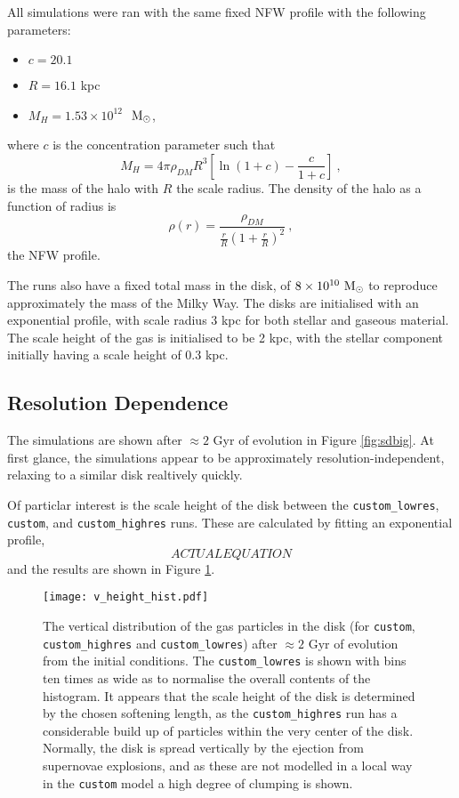 All simulations were ran with the same fixed NFW profile with the following parameters:
\begin{itemize}
    \item $c = 20.1$
    \item $R = 16.1$ kpc
    \item $M_{H} = 1.53 \times 10^{12}$ $~\mathrm{M}_{\odot}$,
\end{itemize}
where $c$ is the concentration parameter such that
$$
    M_{H} = 4\pi \rho_{DM} R^3 \left[ \ln (1 + c) - \frac{c}{1+c} \right]~,
$$
is the mass of the halo with $R$ the scale radius.
The density of the halo as a function of radius is 
\begin{equation}
    \rho(r) = \frac{\rho_{DM}}{\frac{r}{R} \left( 1 + \frac{r}{R} \right)^2}~,
    \label{eqn:nfw}
\end{equation}
the NFW profile.

The runs also have a fixed total mass in the disk, of $8\times10^{10} ~\mathrm{M}_{\odot}$ to reproduce approximately the mass of the Milky Way.
The disks are initialised with an exponential profile, with scale radius $3$ kpc for both stellar and gaseous material.
The scale height of the gas is initialised to be 2 kpc, with the stellar component initially having a scale height of 0.3 kpc.

\subsection{Resolution Dependence}

The simulations are shown after $\approx 2$ Gyr of evolution in Figure \ref{fig:sdbig}. At first glance, the simulations appear to be approximately resolution-independent, relaxing to a similar disk realtively quickly.

Of particlar interest is the scale height of the disk between the {\tt custom\_lowres}, {\tt custom}, and {\tt custom\_highres} runs.
These are calculated by fitting an exponential profile,
$$
    ACTUAL EQUATION
$$
and the results are shown in Figure \ref{fig:vheighthist}.

\begin{figure}
    \centering
    \texttt{[image: v\_height\_hist.pdf]}
    \caption{The vertical distribution of the gas particles in the disk (for {\tt custom}, {\tt custom\_highres} and {\tt custom\_lowres}) after $\approx 2$ Gyr of evolution from the initial conditions. The {\tt custom\_lowres} is shown with bins ten times as wide as to normalise the overall contents of the histogram. It appears that the scale height of the disk is determined by the chosen softening length, as the {\tt custom\_highres} run has a considerable build up of particles within the very center of the disk. Normally, the disk is spread vertically by the ejection from supernovae explosions, and as these are not modelled in a local way in the {\tt custom} model a high degree of clumping is shown.}
    \label{fig:vheighthist}
\end{figure}

